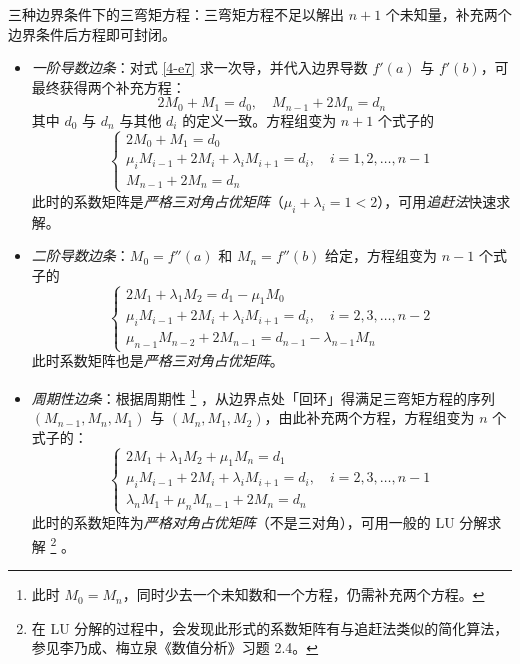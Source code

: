 \entry 三种边界条件下的三弯矩方程：三弯矩方程不足以解出 $n+1$ 个未知量，补充两个边界条件后方程即可封闭。
\begin{itemize}
    \item \emph{一阶导数边条}：对式 \eqref{4-e7} 求一次导，并代入边界导数 $f'(a)$ 与 $f'(b)$，可最终获得两个补充方程：
    \begin{equation}
    2M_0+M_1=d_0,\quad M_{n-1}+2M_n=d_n
    \end{equation}
    其中 $d_0$ 与 $d_n$ 与其他 $d_i$ 的定义一致。方程组变为 $n+1$ 个式子的
    \begin{equation}
    \begin{cases}
    2M_0+M_1=d_0\\
    \mu_iM_{i-1}+2M_i+\lambda_iM_{i+1}=d_i,\quad i=1,2,\ldots,n-1\\
    M_{n-1}+2M_n=d_n
    \end{cases}
    \end{equation}
    此时的系数矩阵是\emph{严格三对角占优矩阵}（$\mu_i+\lambda_i=1<2$），可用\emph{追赶法}快速求解。
    \item \emph{二阶导数边条}：$M_0=f''(a)$ 和 $M_n=f''(b)$ 给定，方程组变为 $n-1$ 个式子的
    \begin{equation}
    \begin{cases}
    2M_1+\lambda_1M_2=d_1-\mu_1M_0\\
    \mu_iM_{i-1}+2M_i+\lambda_iM_{i+1}=d_i,\quad i=2,3,\ldots,n-2\\
    \mu_{n-1}M_{n-2}+2M_{n-1}=d_{n-1}-\lambda_{n-1}M_n
    \end{cases}
    \end{equation}
    此时系数矩阵也是\emph{严格三对角占优矩阵}。
    \item \emph{周期性边条}：根据周期性
    \footnote{此时 $M_0=M_n$，同时少去一个未知数和一个方程，仍需补充两个方程。}
    ，从边界点处「回环」得满足三弯矩方程的序列 $(M_{n-1},M_n,M_1)$ 与 $(M_n,M_1,M_2)$，由此补充两个方程，方程组变为 $n$ 个式子的：
    \begin{equation}
    \begin{cases}
    2M_1+\lambda_1M_2+\mu_1M_n=d_1\\
    \mu_iM_{i-1}+2M_i+\lambda_iM_{i+1}=d_i,\quad i=2,3,\ldots,n-1\\
    \lambda_nM_1+\mu_nM_{n-1}+2M_n=d_n
    \end{cases}
    \end{equation}
    此时的系数矩阵为\emph{严格对角占优矩阵}（不是三对角），可用一般的 LU 分解求解
    \footnote{在 LU 分解的过程中，会发现此形式的系数矩阵有与追赶法类似的简化算法，参见李乃成、梅立泉《数值分析》习题 2.4。}
    。
\end{itemize}

